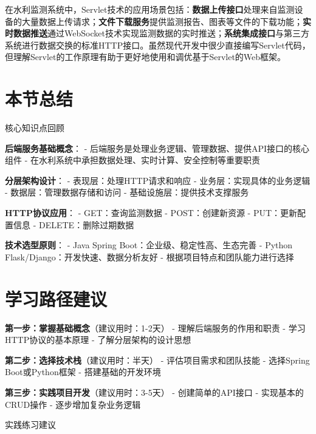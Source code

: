 在水利监测系统中，Servlet技术的应用场景包括：\textbf{数据上传接口}处理来自监测设备的大量数据上传请求；\textbf{文件下载服务}提供监测报告、图表等文件的下载功能；\textbf{实时数据推送}通过WebSocket技术实现监测数据的实时推送；\textbf{系统集成接口}与第三方系统进行数据交换的标准HTTP接口。虽然现代开发中很少直接编写Servlet代码，但理解Servlet的工作原理有助于更好地使用和调优基于Servlet的Web框架。

\section{本节总结}

 核心知识点回顾

\textbf{后端服务基础概念}： - 后端服务是处理业务逻辑、管理数据、提供API接口的核心组件 - 在水利系统中承担数据处理、实时计算、安全控制等重要职责

\textbf{分层架构设计}： - 表现层：处理HTTP请求和响应 - 业务层：实现具体的业务逻辑 - 数据层：管理数据存储和访问 - 基础设施层：提供技术支撑服务

\textbf{HTTP协议应用}： - GET：查询监测数据 - POST：创建新资源 - PUT：更新配置信息 - DELETE：删除过期数据

\textbf{技术选型原则}： - Java Spring Boot：企业级、稳定性高、生态完善 - Python Flask/Django：开发快速、数据分析友好 - 根据项目特点和团队能力进行选择


\section{学习路径建议}

\textbf{第一步：掌握基础概念}（建议用时：1-2天） - 理解后端服务的作用和职责 - 学习HTTP协议的基本原理 - 了解分层架构的设计思想

\textbf{第二步：选择技术栈}（建议用时：半天） - 评估项目需求和团队技能 - 选择Spring Boot或Python框架 - 搭建基础的开发环境

\textbf{第三步：实践项目开发}（建议用时：3-5天） - 创建简单的API接口 - 实现基本的CRUD操作 - 逐步增加复杂业务逻辑

 实践练习建议

